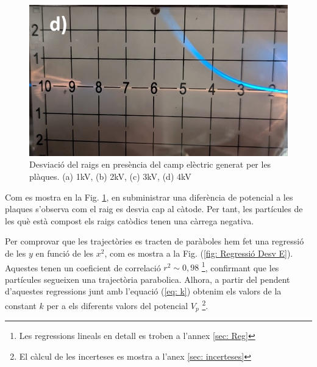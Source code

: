 \documentclass[11pt]{article}
\begin{document}
\begin{figure}[h]
\begin{minipage}{0.38\textwidth}
    \end{minipage}
    \begin{minipage}{0.38\textwidth}
        \centering
        \includegraphics[width=\textwidth]{4kV.jpg}
    \end{minipage}
    \caption{Desviació del raigs en presència del camp elèctric generat per les plàques. (a) 1kV, (b) 2kV, (c) 3kV, (d) 4kV}
    \label{fig: Desv E}
\end{figure}

Com es mostra en la Fig. \ref{fig: Desv E}, en subministrar una diferència de potencial a les plaques s'observa com el raig es desvia cap al càtode. Per tant, les partícules de les què està compost els raigs catòdics tenen una càrrega negativa.

 Per comprovar que les trajectòries es tracten de paràboles hem fet una regressió de les $y$ en funció de les $x^2$, com es mostra a la Fig. (\ref{fig: Regressió Desv E}). Aquestes tenen un coeficient de correlació $r^2 \sim 0,98$ \footnote{Les regressions lineals en detall es troben a l'annex \ref{sec: Reg}}, confirmant que les partícules segueixen una trajectòria parabolica. Alhora, a partir del pendent d'aquestes regressions junt amb l'equació (\ref{eq: k}) obtenim els valors de la constant $k$ per a els diferents valors del potencial $V_p$ \footnote{El càlcul de les incerteses es mostra a l'anex \ref{sec: incerteses}}.
 
\end{document}
